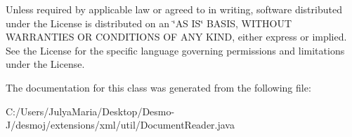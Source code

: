 Unless required by applicable law or agreed to in writing, software distributed under the License is distributed on an \char`\"{}\-A\-S I\-S\char`\"{} B\-A\-S\-I\-S, W\-I\-T\-H\-O\-U\-T W\-A\-R\-R\-A\-N\-T\-I\-E\-S O\-R C\-O\-N\-D\-I\-T\-I\-O\-N\-S O\-F A\-N\-Y K\-I\-N\-D, either express or implied. See the License for the specific language governing permissions and limitations under the License. 

The documentation for this class was generated from the following file\-:\begin{DoxyCompactItemize}
\item 
C\-:/\-Users/\-Julya\-Maria/\-Desktop/\-Desmo-\/\-J/desmoj/extensions/xml/util/Document\-Reader.\-java\end{DoxyCompactItemize}
